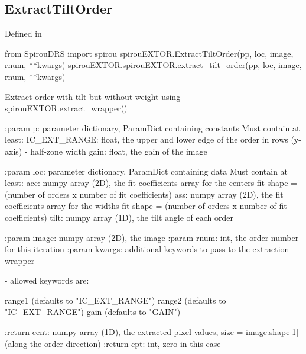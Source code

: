 \begin{minipage}{\textwidth}
\subsection{ExtractTiltOrder}

Defined in \spirouEXTOR{}

\begin{pythonbox}
from SpirouDRS import spirou
spirouEXTOR.ExtractTiltOrder(pp, loc, image, rnum, **kwargs)
spirouEXTOR.spirouEXTOR.extract_tilt_order(pp, loc, image, rnum, **kwargs)
\end{pythonbox}

\begin{pythondocstring}
Extract order with tilt but without weight using
spirouEXTOR.extract_wrapper()

:param p: parameter dictionary, ParamDict containing constants
    Must contain at least:
            IC_EXT_RANGE: float, the upper and lower edge of the order
                          in rows (y-axis) - half-zone width
            gain: float, the gain of the image

:param loc: parameter dictionary, ParamDict containing data
        Must contain at least:
            acc: numpy array (2D), the fit coefficients array for
                  the centers fit
                  shape = (number of orders x number of fit coefficients)
            ass: numpy array (2D), the fit coefficients array for
                  the widths fit
                  shape = (number of orders x number of fit coefficients)
            tilt: numpy array (1D), the tilt angle of each order

:param image: numpy array (2D), the image
:param rnum: int, the order number for this iteration
:param kwargs: additional keywords to pass to the extraction wrapper

        - allowed keywords are:

        range1  (defaults to "IC_EXT_RANGE")
        range2  (defaults to "IC_EXT_RANGE")
        gain    (defaults to "GAIN")

:return cent: numpy array (1D), the extracted pixel values,
             size = image.shape[1] (along the order direction)
:return cpt: int, zero in this case
\end{pythondocstring}
\end{minipage}


